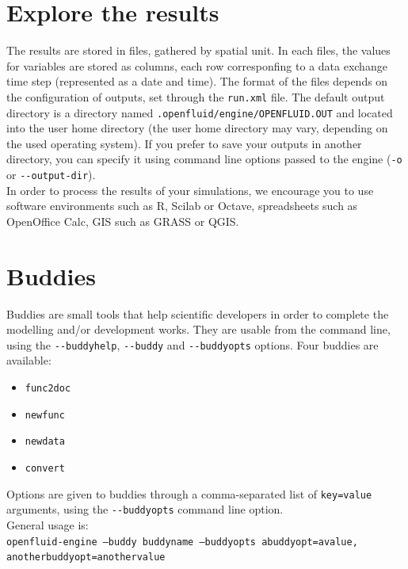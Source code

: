 \section{Explore the results}

The results are stored in files, gathered by spatial unit. In each files, the values for variables are stored as columns, each row corresponfing to a data exchange time step (represented as a date and time).
The format of the files depends on the configuration of outputs, set through the \texttt{run.xml} file.
The default output directory is a directory named \texttt{.openfluid/engine/OPENFLUID.OUT} and located into the user home directory (the user home directory may vary, depending on the used operating system).
If you prefer to save your outputs in another directory, you can specify it using command line options passed to the engine (\texttt{-o} or \verb?--?\texttt{output-dir}).\\

\noindent In order to process the results of your simulations, we encourage you to use software environments such as R, Scilab or Octave, spreadsheets such as OpenOffice Calc, GIS such as GRASS or QGIS.   

\section{Buddies}

Buddies are small tools that help scientific developers in order to complete the modelling and/or development works. They are usable from the command line, using the \verb?--?\texttt{buddyhelp}, \verb?--?\texttt{buddy} and \verb?--?\texttt{buddyopts} options. Four buddies are available:
\begin{itemize}
  \item \texttt{func2doc}  
  \item \texttt{newfunc}
  \item \texttt{newdata}
  \item \texttt{convert}
\end{itemize}

\noindent Options are given to buddies through a comma-separated list of \texttt{key=value} arguments, using the \verb?--?\texttt{buddyopts} command line option.\\

\noindent General usage is:\\
\texttt{openfluid-engine --buddy buddyname --buddyopts abuddyopt=avalue,
anotherbuddyopt=anothervalue}

